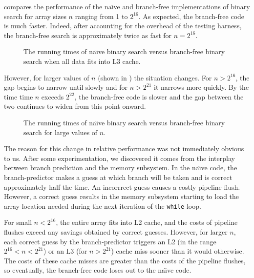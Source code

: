 \documentclass{patmorin}
\begin{document}
 compares the performance of the na\"{\i}ve and
branch-free implementations of binary search for array sizes $n$
ranging from 1 to $2^{16}$.  As expected, the branch-free code is much
faster. Indeed, after accounting for the overhead of the testing harness,
the branch-free search is approximately twice as fast for $n=2^{16}$.

\begin{figure}
   \caption{The running times of na\"{\i}ve binary search versus
    branch-free binary search when all data
    fits into L3 cache.}
\end{figure}

However, for larger values of $n$ (shown in ) the
situation changes.  For $n>2^{16}$, the gap begins to narrow until
slowly and for $n>2^{21}$ it narrows more quickly.  By the time time $n$
exceeds $2^{22}$, the branch-free code is slower and the gap between
the two continues to widen from this point onward.

\begin{figure}
   \caption{The running times of na\"{\i}ve binary search versus
    branch-free binary search for large values of $n$.}
\end{figure}

The reason for this change in relative performance was not immediately
obvious to us.  After some experimentation, we discovered it comes
from the interplay between branch prediction and the memory subsystem.
In the na\"{\i}ve code, the branch-predictor makes a guess at which branch
will be taken and is correct approximately half the time. An incorrrect
guess causes a costly pipeline flush.  However, a correct guess results
in the memory subsystem starting to load the array location needed during
the next iteration of the \texttt{while} loop.

For small $n<2^{16}$, the entire array fits into L2 cache, and the costs
of pipeline flushes exceed any savings obtained by correct guesses.
However, for larger $n$, each correct guess by the branch-predictor
triggers an L2 (in the range $2^{16}<n<2^{21}$) or an L3 (for $n>2^{21}$)
cache miss sooner than it would otherwise.  The costs of these cache
misses are greater than the costs of the pipeline flushes, so eventually,
the branch-free code loses out to the na\"{\i}ve code.
\end{document}
